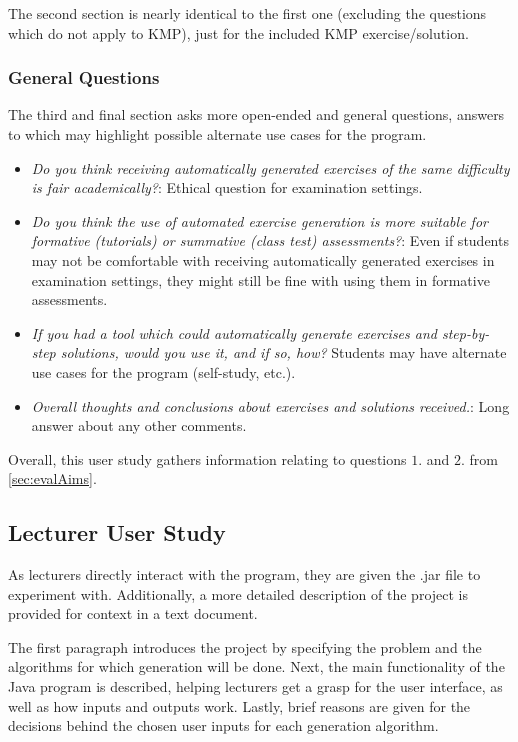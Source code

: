 \documentclass{l4proj}
\begin{document}
The second section is nearly identical to the first one (excluding the questions which do not apply to KMP), just for the included KMP exercise/solution.

\subsubsection{General Questions}

The third and final section asks more open-ended and general questions, answers to which may highlight possible alternate use cases for the program.

\begin{itemize}
	\item
	\emph{Do you think receiving automatically generated exercises of the same difficulty is fair academically?}: Ethical question for examination settings.
	\item
	\emph{Do you think the use of automated exercise generation is more suitable for formative (tutorials) or summative (class test) assessments?}: Even if students may not be comfortable with receiving automatically generated exercises in examination settings, they might still be fine with using them in formative assessments.
	\item
	\emph{If you had a tool which could automatically generate exercises and step-by-step solutions, would you use it, and if so, how?} Students may have alternate use cases for the program (self-study, etc.).
	\item
	\emph{Overall thoughts and conclusions about exercises and solutions received.}: Long answer about any other comments.
\end{itemize}

Overall, this user study gathers information relating to questions $1.$ and $2.$ from \autoref{sec:evalAims}.

\subsection{Lecturer User Study}

As lecturers directly interact with the program, they are given the .jar file to experiment with. Additionally, a more detailed description of the project is provided for context in a text document.

The first paragraph introduces the project by specifying the problem and the algorithms for which generation will be done. Next, the main functionality of the Java program is described, helping lecturers get a grasp for the user interface, as well as how inputs and outputs work. Lastly, brief reasons are given for the decisions behind the chosen user inputs for each generation algorithm.
\end{document}
